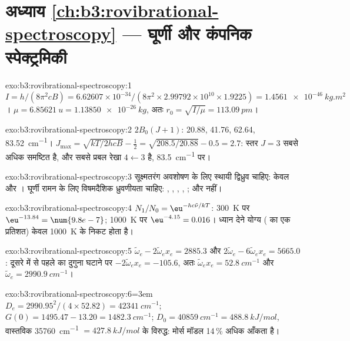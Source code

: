 \section*{अध्याय \ref{ch:b3:rovibrational-spectroscopy} --- घूर्णी और कंपनिक स्पेक्ट्रमिकी}

\begin{solution}{exo:b3:rovibrational-spectroscopy:1}
$I = h/(8\pi^2cB) = 6.62607 \times 10^{-34}/(8\pi^2 \times 2.99792 \times 10^{10} \times
1.9225) = \qty{1.4561e-46}{kg.m^2}$। $\mu = \qty{6.85621}{u} = \qty{1.13850e-26}{kg}$, अतः
$r_0 = \sqrt{I/\mu} = \qty{113.09}{pm}$।
\end{solution}

\begin{solution}{exo:b3:rovibrational-spectroscopy:2}
$2B_0(J+1)$: 20.88, 41.76, 62.64, \qty{83.52}{cm^{-1}}। $J_{\max} = \sqrt{kT/2hcB} -
\frac12 = \sqrt{208.5/20.88} - 0.5 = 2.7$: स्तर $J = 3$ सबसे अधिक
समष्टित है, और सबसे प्रबल रेखा $4 \leftarrow 3$ है, \qty{83.5}{cm^{-1}} पर।
\end{solution}

\begin{solution}{exo:b3:rovibrational-spectroscopy:3}
सूक्ष्मतरंग अवशोषण के लिए स्थायी द्विध्रुव चाहिए: केवल  और ।
घूर्णी रामन के लिए विषमदैशिक ध्रुवणीयता चाहिए: , , ,
, ;   और  नहीं।
\end{solution}

\begin{solution}{exo:b3:rovibrational-spectroscopy:4}
$N_1/N_0 = \eu^{-hc\tilde\nu/kT}$: \qty{300}{K} पर $\eu^{-13.84} = \num{9.8e-7}$;
\qty{1000}{K} पर $\eu^{-4.15} = 0.016$।  ध्यान देने योग्य ( का
एक प्रतिशत) केवल \qty{1000}{K} के निकट होता है।
\end{solution}

\begin{solution}{exo:b3:rovibrational-spectroscopy:5}
$\tilde\omega_e - 2\tilde\omega_ex_e = 2885.3$ और $2\tilde\omega_e - 6\tilde\omega_ex_e =
5665.0$: दूसरे में से पहले का दुगुना घटाने पर $-2\tilde\omega_ex_e = -105.6$,
अतः $\tilde\omega_ex_e = \qty{52.8}{cm^{-1}}$ और $\tilde\omega_e = \qty{2990.9}{cm^{-1}}$।
\end{solution}

\begin{solution}{exo:b3:rovibrational-spectroscopy:6}\emergencystretch=3em
$D_e = 2990.95^2/(4 \times 52.82) = \qty{42341}{cm^{-1}}$; $G(0) = 1495.47 - 13.20 =
\qty{1482.3}{cm^{-1}}$; $D_0 = \qty{40859}{cm^{-1}} = \qty{488.8}{kJ/mol}$, वास्तविक
\qty{35760}{cm^{-1}} $= \qty{427.8}{kJ/mol}$ के विरुद्ध: मोर्स मॉडल 14\,\% अधिक आँकता है।
\end{solution}


